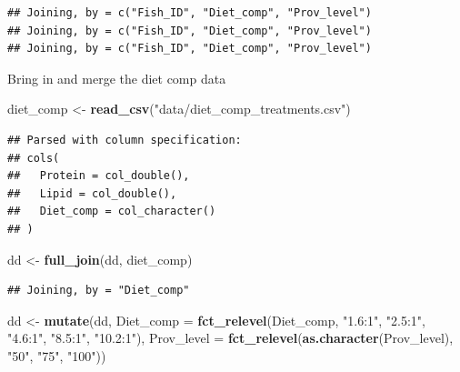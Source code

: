 \documentclass[]{book}
\newenvironment{Shaded}{\begin{snugshade}}{\end{snugshade}}
\newcommand{\DataTypeTok}[1]{\textcolor[rgb]{0.13,0.29,0.53}{#1}}
\newcommand{\KeywordTok}[1]{\textcolor[rgb]{0.13,0.29,0.53}{\textbf{#1}}}
\newcommand{\NormalTok}[1]{#1}
\newcommand{\StringTok}[1]{\textcolor[rgb]{0.31,0.60,0.02}{#1}}
\begin{document}
\begin{verbatim}
## Joining, by = c("Fish_ID", "Diet_comp", "Prov_level")
## Joining, by = c("Fish_ID", "Diet_comp", "Prov_level")
## Joining, by = c("Fish_ID", "Diet_comp", "Prov_level")
\end{verbatim}

Bring in and merge the diet comp data

\begin{Shaded}
\begin{Highlighting}[]
\NormalTok{diet_comp <-}\StringTok{ }\KeywordTok{read_csv}\NormalTok{(}\StringTok{"data/diet_comp_treatments.csv"}\NormalTok{)}
\end{Highlighting}
\end{Shaded}

\begin{verbatim}
## Parsed with column specification:
## cols(
##   Protein = col_double(),
##   Lipid = col_double(),
##   Diet_comp = col_character()
## )
\end{verbatim}

\begin{Shaded}
\begin{Highlighting}[]
\NormalTok{dd <-}\StringTok{ }\KeywordTok{full_join}\NormalTok{(dd, diet_comp)}
\end{Highlighting}
\end{Shaded}

\begin{verbatim}
## Joining, by = "Diet_comp"
\end{verbatim}

\begin{Shaded}
\begin{Highlighting}[]
\NormalTok{dd <-}\StringTok{ }\KeywordTok{mutate}\NormalTok{(dd,}
             \DataTypeTok{Diet_comp =} \KeywordTok{fct_relevel}\NormalTok{(Diet_comp,}
                                            \StringTok{"1.6:1"}\NormalTok{,}
                                            \StringTok{"2.5:1"}\NormalTok{,}
                                            \StringTok{"4.6:1"}\NormalTok{,}
                                            \StringTok{"8.5:1"}\NormalTok{,}
                                            \StringTok{"10.2:1"}\NormalTok{),}
             \DataTypeTok{Prov_level =} \KeywordTok{fct_relevel}\NormalTok{(}\KeywordTok{as.character}\NormalTok{(Prov_level),}
                                            \StringTok{"50"}\NormalTok{,}
                                            \StringTok{"75"}\NormalTok{,}
                                            \StringTok{"100"}\NormalTok{))}
\end{Highlighting}
\end{Shaded}
\end{document}
